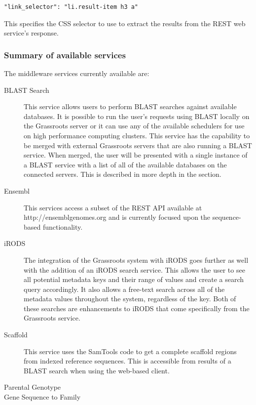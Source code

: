 \documentclass[9pt,a4paper]{extarticle}
\begin{document}
\begin{lstlisting}[style=json]
"link_selector": "li.result-item h3 a"
\end{lstlisting}
This specifies the CSS selector to use to extract the results from the REST web service's response.

\subsubsection*{Summary of available services}

The middleware services currently available are:

\begin{description}

\item [BLAST Search] This service allows users to perform BLAST searches against available databases.
It is possible to run the user's requests using BLAST locally on the Grassroots server or it can use any of the available schedulers for use on high performance computing clusters. 
This service has the capability to be merged with external Grassroots servers that are
also running a BLAST service. 
When merged, the user will be presented with a single instance of a BLAST service with a list of all of the available databases on the connected servers. 
This is described in more depth in the  section. 


\item [Ensembl] This services access a subset of the REST API available at http://ensemblgenomes.org\cite{kersey2016ensembl} and is currently focused upon the sequence-based functionality.

\item [iRODS] The integration of the Grassroots system with iRODS goes further as well with the addition of an iRODS search service. 
This allows the user to see all potential metadata keys and their range of values and create a search query accordingly.
It also allows a free-text search across all of the metadata values throughout the system, regardless of the key. 
Both of these searches are enhancements to iRODS that come specifically from the Grassroots service.

\item [Scaffold] This service uses the SamTools\cite{li2009sequence} code to get a complete scaffold regions from indexed reference sequences. 
This is accessible from results of a BLAST search when using the web-based client.

\item [Parental Genotype] 

\item [Gene Sequence to Family] 




\end{description}
\end{document}
